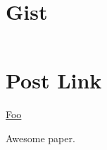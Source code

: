 \documentclass[]{article}
\begin{document}
\section{Gist}\label{gist}

\inputminted[mathescape, linenos, frame=lines, framesep=2mm]{Python}{.gist-cache/cache.7aeefc0de1bb10005514355a5c4a5dfe-1c74b8336494cb0e9c6d-xor-5d.py}

\section{Post Link}\label{post-link}

\href{http://localhost:4000/2015/04/29/foo/}{Foo}

Awesome paper\cite{mikolov2013efficient}.





\renewcommand{\thefootnote}{}

\end{document}
